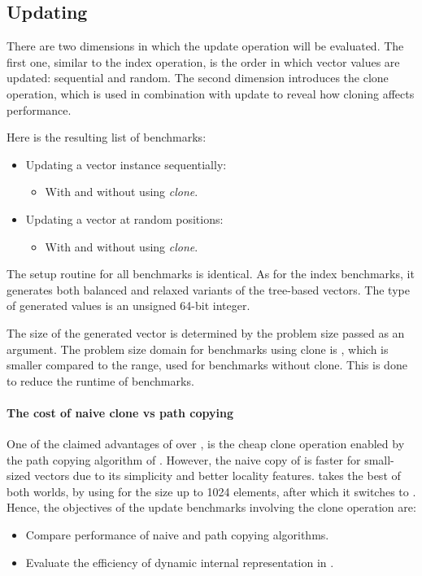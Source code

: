 \subsection{Updating}
There are two dimensions in which the update operation will be evaluated. The first one, similar to the index operation, is the order in which vector values are updated: sequential and random. The second dimension introduces the clone operation, which is used in combination with update to reveal how cloning affects performance.

Here is the resulting list of benchmarks:
\begin{itemize}
    \item Updating a vector instance sequentially:
    \begin{itemize}
        \item With and without using \emph{clone}.
    \end{itemize}
    \item Updating a vector at random positions:
    \begin{itemize}
        \item With and without using \emph{clone}.
    \end{itemize}
\end{itemize}

The setup routine for all benchmarks is identical. As for the index benchmarks, it generates both balanced and relaxed variants of the tree-based vectors. The type of generated values is an unsigned 64-bit integer.

The size of the generated vector is determined by the problem size passed as an argument. The problem size domain for benchmarks using clone is \range{[10, 20000]}, which is smaller compared to the \range{[10, 100000]} range, used for benchmarks without clone. This is done to reduce the runtime of benchmarks.

\paragraph*{The cost of naive clone vs path copying}
One of the claimed advantages of \rbvec{} over \stdvec{}, is the cheap clone operation enabled by the path copying algorithm of \rbtree{}. However, the naive copy of \stdvec{} is faster for small-sized vectors due to its simplicity and better locality features. \pvec{} takes the best of both worlds, by using \stdvec{} for the size up to 1024 elements, after which it switches to \rbvec{}. Hence, the objectives of the update benchmarks involving the clone operation are:
\begin{itemize}
    \item Compare performance of naive and path copying algorithms.
    \item Evaluate the efficiency of dynamic internal representation in \pvec{}.
\end{itemize}

